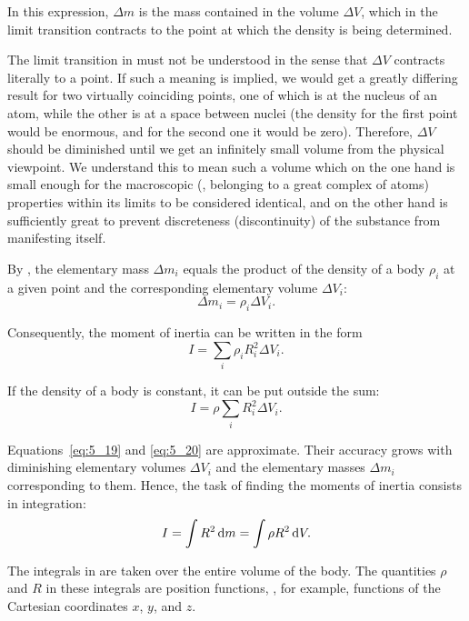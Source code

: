 \noindent
In this expression, $\Delta m$ is the mass contained in the volume $\Delta V$, which in the limit transition contracts to the point at which the density is being determined.

The limit transition in  must not be understood in the sense that $\Delta V$ contracts literally to a point. If such a meaning is implied, we would get a greatly differing result for two virtually coinciding points, one of which is at the nucleus of an atom, while the other is at a space between nuclei (the density for the first point would be enormous, and for the second one it would be zero). Therefore, $\Delta V$ should be diminished until we get an infinitely small volume from the physical viewpoint. We understand this to mean such a volume which on the one hand is small enough for the macroscopic (\ie, belonging to a great complex of atoms) properties within its limits to be considered identical, and on the other hand is sufficiently great to prevent discreteness (discontinuity) of the substance from manifesting itself.

By , the elementary mass $\Delta m_i$ equals the product of the density of a body $\rho_i$ at a given point and the corresponding elementary volume $\Delta V_i$:
\begin{equation*}
\Delta m_i = \rho_i \Delta V_i.
\end{equation*}

\noindent
Consequently, the moment of inertia can be written in the form
\begin{equation}\label{eq:5_19}
I = \sum_i \rho_i R_i^2 \Delta V_i.
\end{equation}

\noindent
If the density of a body is constant, it can be put outside the sum:
\begin{equation}\label{eq:5_20}
I = \rho \sum_i R_i^2 \Delta V_i.
\end{equation}

Equations~\eqref{eq:5_19} and \eqref{eq:5_20} are approximate. Their accuracy grows with diminishing elementary volumes $\Delta V_i$ and the elementary masses $\Delta m_i$ corresponding to them. Hence, the task of finding the moments of inertia consists in integration:
\begin{equation}\label{eq:5_21}
I = \int R^2\, \mathrm{d} m = \int \rho R^2\, \mathrm{d} V.
\end{equation}

\noindent
The integrals in  are taken over the entire volume of the body. The quantities $\rho$ and $R$ in these integrals are position functions, \ie, for example, functions of the Cartesian coordinates $x$, $y$, and $z$.


